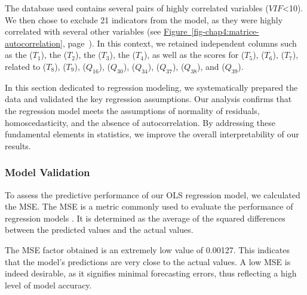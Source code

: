 \begin{refsegment}
The database used contains several pairs of highly correlated variables (\(VIF\)\textless10). We then chose to exclude 21 indicators from the model, as they were highly correlated with several other variables (see \hyperref[fig-chap4:matrice-autocorrelation]{Figure~\ref{fig-chap4:matrice-autocorrelation}}, page~\pageref{fig-chap4:matrice-autocorrelation}). In this context, we retained independent columns such as the  (\(T_{1}\)), the  (\(T_{2}\)), the  (\(T_{3}\)), the  (\(T_{4}\)), as well as the scores for  (\(T_{5}\)),  (\(T_{6}\)),  (\(T_{7}\)), related to  (\(T_{8}\)),  (\(T_{9}\)),  (\(Q_{16}\)),  (\(Q_{30}\)),  (\(Q_{34}\)),  (\(Q_{37}\)),  (\(Q_{38}\)), and  (\(Q_{39}\)). %

In this section dedicated to regression modeling, we systematically prepared the data and validated the key regression assumptions. Our analysis confirms that the regression model meets the assumptions of normality of residuals, homoscedasticity, and the absence of autocorrelation. By addressing these fundamental elements in statistics, we improve the overall interpretability of our results. %

\subsubsection*{Model Validation
    \label{chap4:methodologie-validation}
    }

To assess the predictive performance of our \acrshort{OLS} regression model, we calculated the \acrfull{MSE}. The \acrshort{MSE} is a \gls{metric} commonly used to evaluate the performance of regression models \textcolor{blue}{\autocite{cochran_sampling_1963}}. It is determined as the average of the squared differences between the predicted values and the actual values. %

The \acrshort{MSE} factor obtained is an extremely low value of 0.00127. This indicates that the model's predictions are very close to the actual values. A low \acrshort{MSE} is indeed desirable, as it signifies minimal forecasting errors, thus reflecting a high level of model accuracy. %


\end{refsegment}
